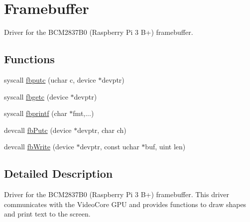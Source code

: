 \hypertarget{group__framebuffer}{\section{Framebuffer}
\label{group__framebuffer}
}


Driver for the B\-C\-M2837\-B0 (Raspberry Pi 3 B+) framebuffer.  


\subsection*{Functions}
\begin{DoxyCompactItemize}
\item 
syscall \hyperlink{group__framebuffer_gabd98f202f1503060580d385d288347b8}{fbputc} (uchar c, device $\ast$devptr)
\item 
syscall \hyperlink{group__framebuffer_ga58dd5ca5672b2a60f6fd7d84b21604fa}{fbgetc} (device $\ast$devptr)
\item 
syscall \hyperlink{group__framebuffer_gae27b27fde448b226b5fdb3b09ba6a6cf}{fbprintf} (char $\ast$fmt,...)
\item 
devcall \hyperlink{group__framebuffer_ga275598c76328d67dd24528da8f6b82a9}{fb\-Putc} (device $\ast$devptr, char ch)
\item 
devcall \hyperlink{group__framebuffer_ga2986864462be3ca8c70bd2da1faf8870}{fb\-Write} (device $\ast$devptr, const uchar $\ast$buf, uint len)
\end{DoxyCompactItemize}


\subsection{Detailed Description}
Driver for the B\-C\-M2837\-B0 (Raspberry Pi 3 B+) framebuffer. This driver communicates with the Video\-Core G\-P\-U and provides functions to draw shapes and print text to the screen. 


